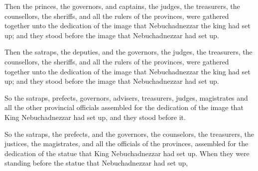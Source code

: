 			Then the princes, the governors, and captains, the judges, the treasurers, the counsellors, the sheriffs, and all the rulers of the provinces, were gathered together unto the dedication of the image that Nebuchadnezzar the king had set up; and they stood before the image that Nebuchadnezzar had set up.

			\begin{versebox}
					\item[BHS] 
					\item[LXX] 
					\item[ASV] Then the satraps, the deputies, and the governors, the judges, the treasurers, the counsellors, the sheriffs, and all the rulers of the provinces, were gathered together unto the dedication of the image that Nebuchadnezzar the king had set up; and they stood before the image that Nebuchadnezzar had set up.
					\item[NIV] So the satraps, prefects, governors, advisers, treasurers, judges, magistrates and all the other provincial officials assembled for the dedication of the image that King Nebuchadnezzar had set up, and they stood before it.
					\item[NRSV] So the satraps, the prefects, and the governors, the counselors, the treasurers, the justices, the magistrates, and all the officials of the provinces, assembled for the dedication of the statue that King Nebuchadnezzar had set up. When they were standing before the statue that Nebuchadnezzar had set up,
			\end{versebox}

